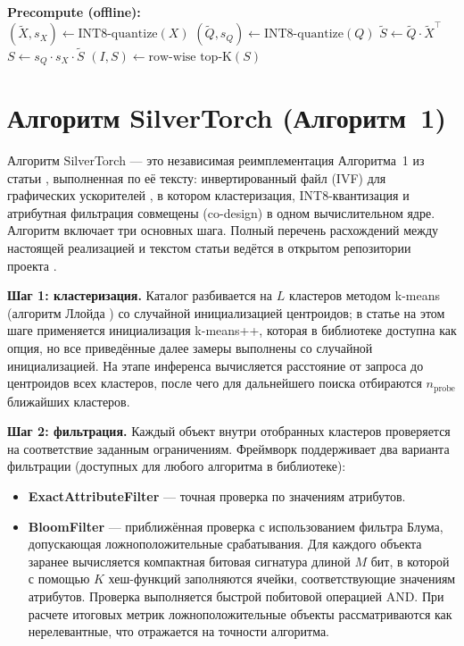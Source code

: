 \documentclass[14pt,a4paper]{extreport}
\numberwithin{figure}{chapter}
\numberwithin{table}{chapter}
\numberwithin{equation}{chapter}
\begin{document}
\begin{algorithm}[htbp]
\caption{LiNR V4 (квантизация в INT8)}
\label{algo:linr_v4}
\textbf{Precompute (offline):}\\
$(\tilde{X}, s_X) \gets \text{INT8-quantize}(X)$\;
$(\tilde{Q}, s_Q) \gets \text{INT8-quantize}(Q)$\;
$\tilde{S} \gets \tilde{Q} \cdot \tilde{X}^\top$\;
$S \gets s_Q \cdot s_X \cdot \tilde{S}$\;
$(I, S) \gets \text{row-wise top-K}(S)$\;
\end{algorithm}

\section{Алгоритм SilverTorch (Алгоритм~1)}

Алгоритм SilverTorch --- это независимая реимплементация Алгоритма~1 из статьи \cite{xue2025silvertorch}, выполненная по её тексту: инвертированный файл (IVF) для графических ускорителей \cite{jegou2011product}, в котором кластеризация, INT8-квантизация и атрибутная фильтрация совмещены (co-design) в одном вычислительном ядре. Алгоритм включает три основных шага. Полный перечень расхождений между настоящей реализацией и текстом статьи ведётся в открытом репозитории проекта \cite{torchretrieve_repo}.

\textbf{Шаг 1: кластеризация.} Каталог разбивается на $L$ кластеров методом k-means (алгоритм Ллойда \cite{lloyd1982least}) со случайной инициализацией центроидов; в статье \cite{xue2025silvertorch} на этом шаге применяется инициализация k-means++, которая в библиотеке доступна как опция, но все приведённые далее замеры выполнены со случайной инициализацией. На этапе инференса вычисляется расстояние от запроса до центроидов всех кластеров, после чего для дальнейшего поиска отбираются $n_\mathrm{probe}$ ближайших кластеров.

\textbf{Шаг 2: фильтрация.} Каждый объект внутри отобранных кластеров проверяется на соответствие заданным ограничениям. Фреймворк поддерживает два варианта фильтрации (доступных для любого алгоритма в библиотеке):
\begin{itemize}
    \item \textbf{ExactAttributeFilter} --- точная проверка по значениям атрибутов.
    \item \textbf{BloomFilter} --- приближённая проверка с использованием фильтра Блума, допускающая ложноположительные срабатывания. Для каждого объекта заранее вычисляется компактная битовая сигнатура длиной $M$ бит, в которой с помощью $K$ хеш-функций заполняются ячейки, соответствующие значениям атрибутов. Проверка выполняется быстрой побитовой операцией AND. При расчете итоговых метрик ложноположительные объекты рассматриваются как нерелевантные, что отражается на точности алгоритма.
\end{itemize}
\end{document}
